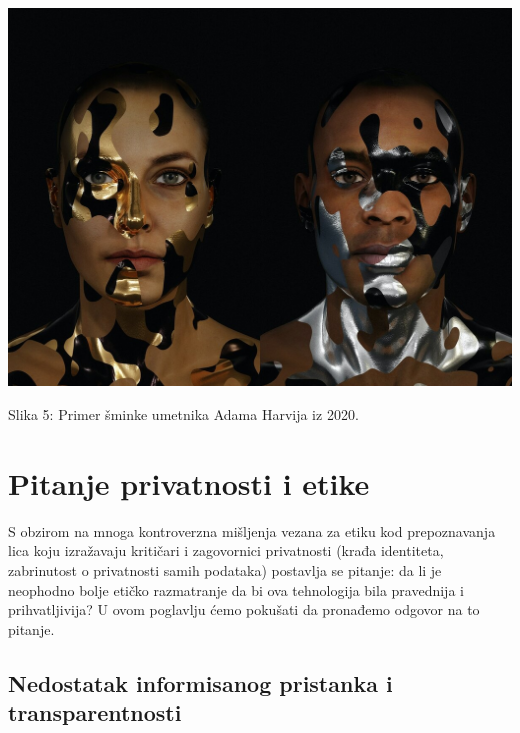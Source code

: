 \documentclass{article}
\begin{document}
\begin{center}
\begin{minipage}{0.5\textwidth}
\includegraphics[width=\textwidth]{sminka2.jpg}
\end{minipage}

\vspace{0.5cm}

Slika 5: Primer šminke umetnika Adama Harvija iz 2020.
\end{center}

\section{Pitanje privatnosti i etike}

S obzirom na mnoga kontroverzna mišljenja vezana za etiku kod prepoznavanja lica koju izražavaju kritičari i zagovornici privatnosti (krađa identiteta, zabrinutost o privatnosti samih podataka) postavlja se pitanje: da li je neophodno bolje etičko razmatranje da bi ova tehnologija bila pravednija i prihvatljivija? 
\newline
U ovom poglavlju ćemo pokušati da pronađemo odgovor na to pitanje.

\subsection{Nedostatak informisanog pristanka i transparentnosti}
\end{document}
